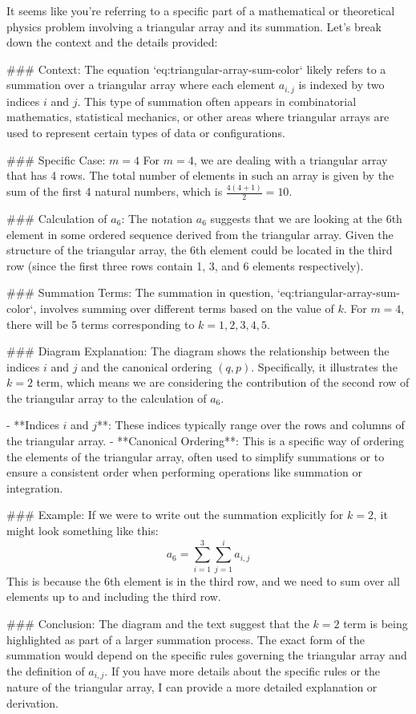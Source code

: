 It seems like you're referring to a specific part of a mathematical or theoretical physics problem involving a triangular array and its summation. Let's break down the context and the details provided:

### Context:
The equation `eq:triangular-array-sum-color` likely refers to a summation over a triangular array where each element \(a_{i,j}\) is indexed by two indices \(i\) and \(j\). This type of summation often appears in combinatorial mathematics, statistical mechanics, or other areas where triangular arrays are used to represent certain types of data or configurations.

### Specific Case: \(m = 4\)
For \(m = 4\), we are dealing with a triangular array that has 4 rows. The total number of elements in such an array is given by the sum of the first 4 natural numbers, which is \(\frac{4(4+1)}{2} = 10\).

### Calculation of \(a_6\):
The notation \(a_6\) suggests that we are looking at the 6th element in some ordered sequence derived from the triangular array. Given the structure of the triangular array, the 6th element could be located in the third row (since the first three rows contain 1, 3, and 6 elements respectively).

### Summation Terms:
The summation in question, `eq:triangular-array-sum-color`, involves summing over different terms based on the value of \(k\). For \(m = 4\), there will be 5 terms corresponding to \(k = 1, 2, 3, 4, 5\).

### Diagram Explanation:
The diagram shows the relationship between the indices \(i\) and \(j\) and the canonical ordering \((q, p)\). Specifically, it illustrates the \(k = 2\) term, which means we are considering the contribution of the second row of the triangular array to the calculation of \(a_6\).

- **Indices \(i\) and \(j\)**: These indices typically range over the rows and columns of the triangular array.
- **Canonical Ordering**: This is a specific way of ordering the elements of the triangular array, often used to simplify summations or to ensure a consistent order when performing operations like summation or integration.

### Example:
If we were to write out the summation explicitly for \(k = 2\), it might look something like this:
\[ a_6 = \sum_{i=1}^{3} \sum_{j=1}^{i} a_{i,j} \]
This is because the 6th element is in the third row, and we need to sum over all elements up to and including the third row.

### Conclusion:
The diagram and the text suggest that the \(k = 2\) term is being highlighted as part of a larger summation process. The exact form of the summation would depend on the specific rules governing the triangular array and the definition of \(a_{i,j}\). If you have more details about the specific rules or the nature of the triangular array, I can provide a more detailed explanation or derivation.